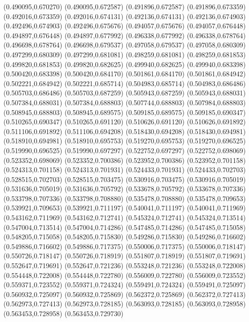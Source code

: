 (0.490095,0.670270)
(0.490095,0.672587)
(0.491896,0.672587)
(0.491896,0.673359)
(0.492016,0.673359)
(0.492016,0.674131)
(0.492136,0.674131)
(0.492136,0.674903)
(0.492496,0.674903)
(0.492496,0.675676)
(0.494057,0.675676)
(0.494057,0.676448)
(0.494897,0.676448)
(0.494897,0.677992)
(0.496338,0.677992)
(0.496338,0.678764)
(0.496698,0.678764)
(0.496698,0.679537)
(0.497058,0.679537)
(0.497058,0.680309)
(0.497299,0.680309)
(0.497299,0.681081)
(0.498259,0.681081)
(0.498259,0.681853)
(0.499820,0.681853)
(0.499820,0.682625)
(0.499940,0.682625)
(0.499940,0.683398)
(0.500420,0.683398)
(0.500420,0.684170)
(0.501861,0.684170)
(0.501861,0.684942)
(0.502221,0.684942)
(0.502221,0.685714)
(0.504983,0.685714)
(0.504983,0.686486)
(0.505703,0.686486)
(0.505703,0.687259)
(0.505943,0.687259)
(0.505943,0.688031)
(0.507384,0.688031)
(0.507384,0.688803)
(0.507744,0.688803)
(0.507984,0.688803)
(0.508945,0.688803)
(0.508945,0.689575)
(0.509185,0.689575)
(0.509185,0.690347)
(0.510265,0.690347)
(0.510265,0.691120)
(0.510626,0.691120)
(0.510626,0.691892)
(0.511106,0.691892)
(0.511106,0.694208)
(0.518430,0.694208)
(0.518430,0.694981)
(0.518910,0.694981)
(0.518910,0.695753)
(0.519270,0.695753)
(0.519270,0.696525)
(0.519990,0.696525)
(0.519990,0.697297)
(0.522752,0.697297)
(0.522752,0.698069)
(0.523352,0.698069)
(0.523352,0.700386)
(0.523952,0.700386)
(0.523952,0.701158)
(0.524313,0.701158)
(0.524313,0.701931)
(0.524433,0.701931)
(0.524433,0.702703)
(0.528515,0.702703)
(0.528515,0.703475)
(0.530916,0.703475)
(0.530916,0.705019)
(0.531636,0.705019)
(0.531636,0.705792)
(0.533678,0.705792)
(0.533678,0.707336)
(0.533798,0.707336)
(0.533798,0.708880)
(0.535478,0.708880)
(0.535478,0.709653)
(0.539921,0.709653)
(0.539921,0.711197)
(0.540041,0.711197)
(0.540041,0.711969)
(0.543162,0.711969)
(0.543162,0.712741)
(0.545324,0.712741)
(0.545324,0.713514)
(0.547004,0.713514)
(0.547004,0.714286)
(0.547485,0.714286)
(0.547485,0.715058)
(0.548205,0.715058)
(0.548205,0.715830)
(0.549286,0.715830)
(0.549286,0.716602)
(0.549886,0.716602)
(0.549886,0.717375)
(0.550006,0.717375)
(0.550006,0.718147)
(0.550726,0.718147)
(0.550726,0.718919)
(0.551807,0.718919)
(0.551807,0.719691)
(0.552647,0.719691)
(0.552647,0.721236)
(0.553248,0.721236)
(0.553248,0.722008)
(0.554448,0.722008)
(0.554448,0.722780)
(0.556009,0.722780)
(0.556009,0.723552)
(0.559371,0.723552)
(0.559371,0.724324)
(0.559491,0.724324)
(0.559491,0.725097)
(0.560932,0.725097)
(0.560932,0.725869)
(0.562372,0.725869)
(0.562372,0.727413)
(0.562973,0.727413)
(0.562973,0.728185)
(0.563093,0.728185)
(0.563093,0.728958)
(0.563453,0.728958)
(0.563453,0.729730)
